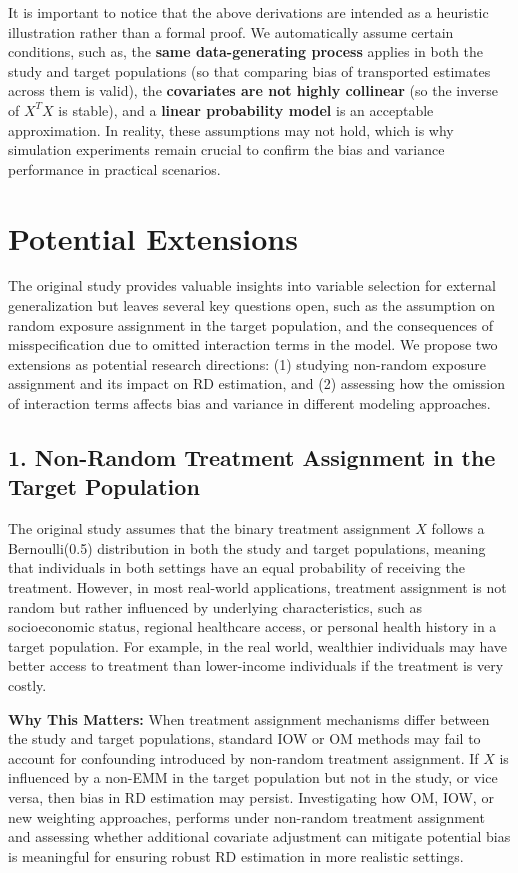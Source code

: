 \documentclass[12pt,oneside]{amsart}
\theoremstyle{definition}
\theoremstyle{remark}
\numberwithin{equation}{section}
\begin{document}
It is important to notice that the above derivations are intended as a heuristic illustration rather than a formal proof.  We automatically assume certain conditions, such as, the \textbf{same data-generating process} applies in both the study and target populations (so that comparing bias of transported estimates across them is valid), the \textbf{covariates are not highly collinear} (so the inverse of $X^TX$ is stable), and  a \textbf{linear probability model} is an acceptable approximation. In reality, these assumptions may not hold, which is why simulation experiments remain crucial to confirm the bias and variance performance in practical scenarios.

\section{Potential Extensions}
The original study provides valuable insights into variable selection for external generalization but leaves several key questions open, such as the assumption on random exposure assignment in the target population, and the consequences of misspecification due to omitted interaction terms in the model. We propose two extensions as potential research directions: (1) studying non-random exposure assignment and its impact on RD estimation, and (2) assessing how the omission of interaction terms affects bias and variance in different modeling approaches.

\subsection{1. Non-Random Treatment Assignment in the Target Population}
The original study assumes that the binary treatment assignment \( X \) follows a Bernoulli(0.5) distribution in both the study and target populations, meaning that individuals in both settings have an equal probability of receiving the treatment. However, in most real-world applications, treatment assignment is not random but rather influenced by underlying characteristics, such as socioeconomic status, regional healthcare access, or personal health history in a target population. For example, in the real world, wealthier individuals may have better access to treatment than lower-income individuals if the treatment is very costly.  

\textbf{Why This Matters:} When treatment assignment mechanisms differ between the study and target populations, standard IOW or OM methods may fail to account for confounding introduced by non-random treatment assignment. If \( X \) is influenced by a non-EMM  in the target population but not in the study, or vice versa, then bias in RD estimation may persist. Investigating how OM, IOW, or new weighting approaches, performs under non-random treatment assignment and assessing whether additional covariate adjustment can mitigate potential bias is meaningful for ensuring robust RD estimation in more realistic settings.
\end{document}
